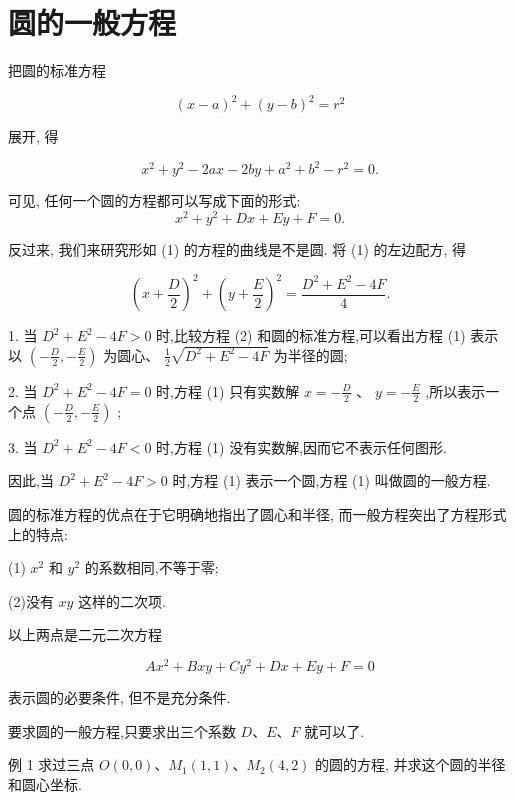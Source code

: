 \documentclass[lang=cn,newtx,12pt,scheme=chinese]{elegantbook}
\begin{document}
\section{圆的一般方程}

把圆的标准方程

\[
    {\left( x - a\right) }^{2} + {\left( y - b\right) }^{2} = {r}^{2}
\]

展开, 得

\[
    {x}^{2} + {y}^{2} - {2ax} - {2by} + {a}^{2} + {b}^{2} - {r}^{2} = 0.
\]

\begin{definition}[圆的一般方程] 
可见, 任何一个圆的方程都可以写成下面的形式:
\[
    {x}^{2} + {y}^{2} + {Dx} + {Ey} + F = 0. \tag{1}
\]
\end{definition}

反过来, 我们来研究形如 (1) 的方程的曲线是不是圆.
将 (1) 的左边配方, 得

\[
    {\left( x + \frac{D}{2}\right) }^{2} + {\left( y + \frac{E}{2}\right) }^{2} = \frac{{D}^{2} + {E}^{2} - {4F}}{4}. \tag{2}
\]

1. 当 \({D}^{2} + {E}^{2} - {4F} > 0\) 时,比较方程 (2) 和圆的标准方程,可以看出方程 (1) 表示以 \(\left( {-\frac{D}{2}, - \frac{E}{2}}\right)\) 为圆心、 \(\frac{1}{2}\sqrt{{D}^{2} + {E}^{2} - {4F}}\) 为半径的圆;

2. 当 \({D}^{2} + {E}^{2} - {4F} = 0\) 时,方程 (1) 只有实数解 \(x = - \frac{D}{2}\) 、 \(y = - \frac{E}{2}\) ,所以表示一个点 \(\left( {-\frac{D}{2}, - \frac{E}{2}}\right)\) ;

3. 当 \({D}^{2} + {E}^{2} - {4F} < 0\) 时,方程 (1) 没有实数解,因而它不表示任何图形.

因此,当 \({D}^{2} + {E}^{2} - {4F} > 0\) 时,方程 (1) 表示一个圆,方程 (1) 叫做圆的一般方程.

圆的标准方程的优点在于它明确地指出了圆心和半径, 而一般方程突出了方程形式上的特点:

(1) \({x}^{2}\) 和 \({y}^{2}\) 的系数相同,不等于零;

(2)没有 \({xy}\) 这样的二次项.

以上两点是二元二次方程

\[
  A{x}^{2} + {Bxy} + C{y}^{2} + {Dx} + {Ey} + F = 0
\]

表示圆的必要条件, 但不是充分条件.

要求圆的一般方程,只要求出三个系数 \(D\text{、}E\text{、}F\) 就可以了.

例 1 求过三点 \(O\left( {0,0}\right) \text{、}{M}_{1}\left( {1,1}\right) \text{、}{M}_{2}\left( {4,2}\right)\) 的圆的方程, 并求这个圆的半径和圆心坐标.
\end{document}
